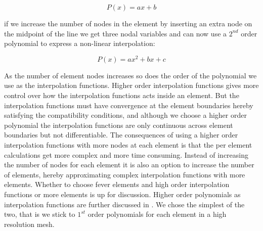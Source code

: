 \begin{equation*}
P(x) = ax + b
\end{equation*}

if we increase the number of nodes in the element by inserting an
extra node on the midpoint of the line we get three nodal variables
and can now use a $2^{nd}$ order polynomial to express a non-linear
interpolation: 

\begin{equation*}
P(x) = ax^2 +bx + c
\end{equation*}

As the number of element nodes increases so does the order of the
polynomial we use as the interpolation
functions. Higher order interpolation functions gives more control over
how the interpolation functions acts inside an element. But the
interpolation functions must have convergence at the element
boundaries hereby satisfying the compatibility conditions, and
although we choose a higher order polynomial the interpolation
functions are only continuous across element boundaries but not
differentiable.
%
The consequences of using a higher order interpolation functions with
more nodes at each element is that the per element calculations get
more complex and more time consuming. Instead of increasing the
number of nodes for each element it is also an option to increase
the number of elements, hereby approximating complex
interpolation functions with more elements. Whether to choose fever
elements and high order interpolation functions or more elements
is up for discussion. Higher order polynomials as
interpolation functions are further discussed in
.
We chose the simplest of the two, that is we stick to
$1^{st}$ order polynomials for each element in a high resolution mesh.\\


